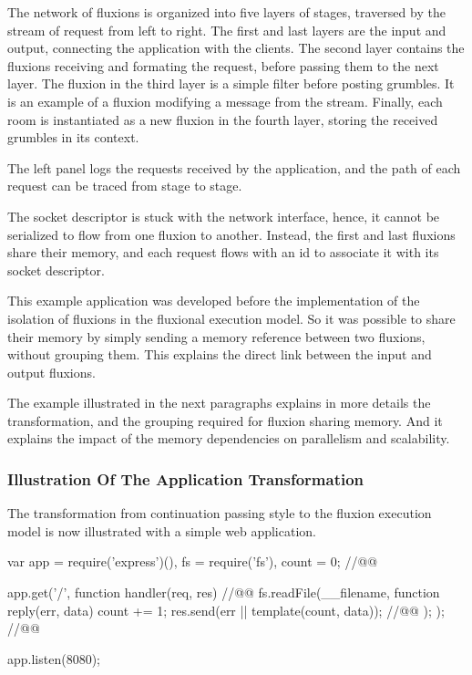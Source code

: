 The network of fluxions is organized into five layers of stages, traversed by the stream of request from left to right.
The first and last layers are the input and output, connecting the application with the clients.
The second layer contains the fluxions receiving and formating the request, before passing them to the next layer.
The fluxion in the third layer is a simple filter before posting grumbles.
It is an example of a fluxion modifying a message from the stream.
Finally, each room is instantiated as a new fluxion in the fourth layer, storing the received grumbles in its context.

The left panel logs the requests received by the application, and the path of each request can be traced from stage to stage.

The socket descriptor is stuck with the network interface, hence, it cannot be serialized to flow from one fluxion to another.
Instead, the first and last fluxions share their memory, and each request flows with an id to associate it with its socket descriptor.

This example application was developed before the implementation of the isolation of fluxions in the fluxional execution model.
So it was possible to share their memory by simply sending a memory reference between two fluxions, without grouping them.
This explains the direct link between the input and output fluxions.

The example illustrated in the next paragraphs explains in more details the transformation, and the grouping required for fluxion sharing memory.
And it explains the impact of the memory dependencies on parallelism and scalability.

\subsubsection{Illustration Of The Application Transformation}

The transformation from continuation passing style to the fluxion execution model is now illustrated with a simple web application.

\begin{code}[js,
  caption={Example web application},
  label={lst:source}]
var app = require('express')(),
    fs = require('fs'),
    count = 0; //@\label{lst:source-counter}@

app.get('/', function handler(req, res){ //@\label{lst:source-handler}@
  fs.readFile(__filename, function reply(err, data) {
    count += 1;
    res.send(err || template(count, data)); //@\label{lst:source-send}@
  });
}); //@\label{lst:source-handler-end}@

app.listen(8080);
\end{code}

